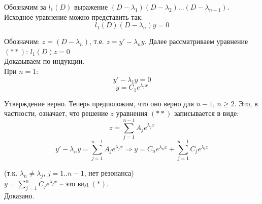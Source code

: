 \documentclass{article}
\begin{document}
	Обозначим за $l_1(D)$ выражение $(D - \lambda_1)(D - \lambda_2)...(D-\lambda_{n-1})$. Исходное уравнение можно представить так:
	\begin{equation}
		l_1(D)(D-\lambda_n)y=0
	\end{equation}

	Обозначим: $z=(D-\lambda_n)$, т.е. $z=y'-\lambda_n y$. Далее рассматриваем уравнение $(**)$: $l_1(D)z=0$\\

	Доказываем по индукции.\\

	При $n=1$:
	\begin{equation}
		y'-\lambda_1y=0
	\end{equation}
	\begin{equation}
		y = C_1e^{\lambda_1 x}
	\end{equation}

	Утверждение верно. Теперь предположим, что оно верно для $n-1$, $n\geq 2$. Это, в частности, означает, что решение $z$ уравнения $(**)$ записывается в виде:
	\begin{equation}
		z = \sum_{j=1}^{n-1} A_j e^{\lambda_j x}
	\end{equation}
	\begin{equation}
		y' - \lambda_n y = \sum_{j=1}^{n-1} A_j e^{\lambda_j x} \Rightarrow y = C_n e^{\lambda_n x} + \sum_{j=1}^{n-1}C_j e^{\lambda_i x} 
	\end{equation}

	(т.к. $\lambda_n\neq \lambda_j$, $j=1..n-1$, нет резонанса)\\

	$y=\sum_{j=1}^n C_j e^{\lambda_jx}$ -- это вид $(*)$.\\

	Доказано.
\end{document}
